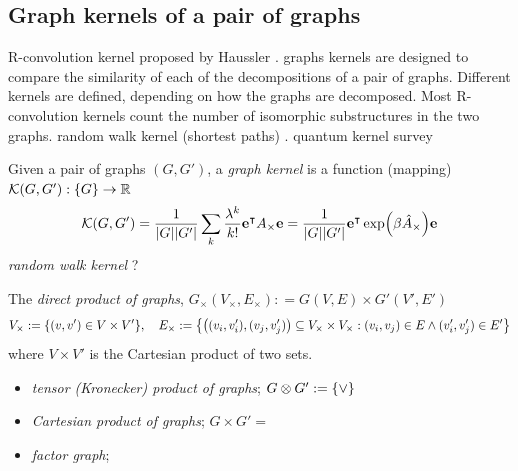 \subsection{Graph kernels of a pair of graphs}
R-convolution kernel proposed by Haussler \cite{hausslerConvolutionKernelsDiscrete1999}.
graphs kernels are designed to compare the similarity of each of the decompositions of a pair of graphs.
Different kernels are defined, depending on how the graphs are decomposed.
Most R-convolution kernels count the number of isomorphic substructures in the two graphs.
random walk kernel (shortest paths)
\cite{vishwanathanGraphKernels2010}. 
quantum kernel
\cite{baiQuantumJensenShannon2015}
survey
\cite{kriegeSurveyGraphKernels2020}
\begin{definition}\label{def:graph_kernel}
	Given a pair of graphs $(G,G')$,
	a \emph{graph kernel} is a function (mapping)
	$\mathcal{K}(G,G'): \qty{ G} \to \mathbb{R}$
	\begin{equation}
		\mathcal{K}(G,G') =
		\frac{1}{\abs{G}\abs{G'}}
		\sum_k \frac{\lambda^k}{k!} \vb{e}^\intercal A_{\times} \vb{e}
		=\frac{1}{\abs{G}\abs{G'}}
		\vb{e}^\intercal \exp(\beta \hat{A}_{\times}) \vb{e}
	\end{equation}
	\emph{random walk kernel} ?
\end{definition}
\begin{definition}\label{def:product_graphs}
	The \emph{direct product of graphs}, 
	$G_{\times}(V_{\times},E_{\times}) : =G(V,E)\times G'(V',E') $
	\begin{equation}
		V_{\times}:= \qty{(v,v')\in V\times V'}
		,\quad
		E_{\times}:= \qty{\qty((v_i,v_i'),(v_j,v_j'))\subseteq V_{\times}\times V_{\times}: (v_i,v_j)\in E \wedge (v_i',v_j')\in E'}
	\end{equation}
	where $V\times V'$ is the Cartesian product of two sets.
	\begin{itemize}
		\item 
	\emph{tensor (Kronecker) product of graphs}; $G\otimes G' := \qty{ \vee }$
		\item 
	\emph{Cartesian product of graphs}; $G\times G' = \qty{}$
		\item 
	\emph{factor graph};
	\end{itemize}
\end{definition}
